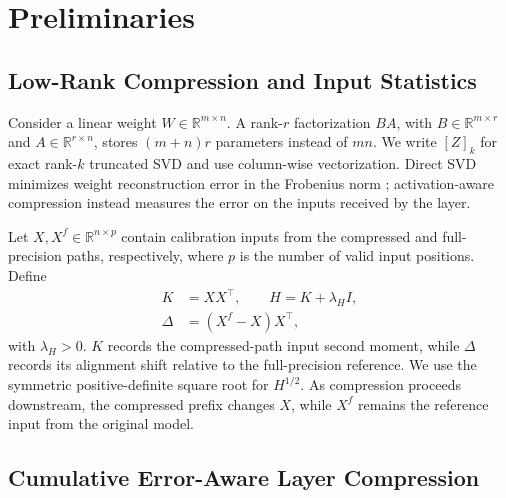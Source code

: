 \documentclass[11pt]{article}
\begin{document}
\section{Preliminaries}\label{sec:preliminaries}

\subsection{Low-Rank Compression and Input Statistics}

Consider a linear weight $W\in\mathbb R^{m\times n}$. A rank-$r$ factorization $BA$, with $B\in\mathbb R^{m\times r}$ and $A\in\mathbb R^{r\times n}$, stores $(m+n)r$ parameters instead of $mn$. We write $[Z]_k$ for exact rank-$k$ truncated SVD and use column-wise vectorization. Direct SVD minimizes weight reconstruction error in the Frobenius norm \citep{eckart1936eym}; activation-aware compression instead measures the error on the inputs received by the layer.

Let $X,X^f\in\mathbb R^{n\times p}$ contain calibration inputs from the compressed and full-precision paths, respectively, where $p$ is the number of valid input positions. Define
\begin{equation}
\begin{aligned}
K&=XX^\top,\qquad H=K+\lambda_H I,\\
\Delta&=(X^f-X)X^\top,
\end{aligned}
\label{eq:input-statistics}
\end{equation}
with $\lambda_H>0$. $K$ records the compressed-path input second moment, while $\Delta$ records its alignment shift relative to the full-precision reference. We use the symmetric positive-definite square root for $H^{1/2}$. As compression proceeds downstream, the compressed prefix changes $X$, while $X^f$ remains the reference input from the original model.

\subsection{Cumulative Error-Aware Layer Compression}\label{sec:cealc}
\end{document}
